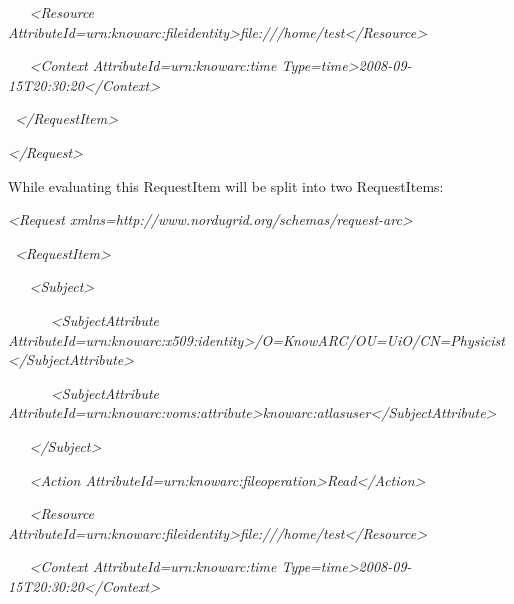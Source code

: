 \documentclass[a4paper]{article}
\begin{document}
{\itshape\color{black}
\ \ \ {\textless}Resource
AttributeId={\textquotedbl}urn:knowarc:fileidentity{\textgreater}file:///home/test{\textless}/Resource{\textgreater}}

{\itshape\color{black}
\ \ \ {\textless}Context
AttributeId={\textquotedbl}urn:knowarc:time{\textquotedbl}
Type={\textquotedbl}time{\textquotedbl}{\textgreater}2008-09-15T20:30:20{\textless}/Context{\textgreater}}

{\itshape\color{black}
\ {\textless}/RequestItem{\textgreater}}

{\itshape\color{black}
{\textless}/Request{\textgreater}}

{\color{black}
While evaluating this RequestItem will be split into two RequestItems:}

{\itshape\color{black}
{\textless}Request
xmlns={\textquotedbl}http://www.nordugrid.org/schemas/request-arc{\textquotedbl}{\textgreater}}

{\itshape\color{black}
\ {\textless}RequestItem{\textgreater}}

{\itshape\color{black}
\ \ \ {\textless}Subject{\textgreater}}

{\itshape\color{black}
\ \ \ \ \ \ {\textless}SubjectAttribute
AttributeId={\textquotedbl}urn:knowarc:x509:identity{\textquotedbl}{\textgreater}/O=KnowARC/OU=UiO/CN=Physicist{\textless}/SubjectAttribute{\textgreater}}

{\itshape\color{black}
\ \ \ \ \ \ {\textless}SubjectAttribute
AttributeId={\textquotedbl}urn:knowarc:voms:attribute{\textgreater}knowarc:atlasuser{\textless}/SubjectAttribute{\textgreater}}

{\itshape\color{black}
\ \ \ {\textless}/Subject{\textgreater}}

{\itshape\color{black}
\ \ \ {\textless}Action
AttributeId={\textquotedbl}urn:knowarc:fileoperation{\textquotedbl}{\textgreater}Read{\textless}/Action{\textgreater}}

{\itshape\color{black}
\ \ \ {\textless}Resource
AttributeId={\textquotedbl}urn:knowarc:fileidentity{\textgreater}file:///home/test{\textless}/Resource{\textgreater}}

{\itshape\color{black}
\ \ \ {\textless}Context
AttributeId={\textquotedbl}urn:knowarc:time{\textquotedbl}
Type={\textquotedbl}time{\textquotedbl}{\textgreater}2008-09-15T20:30:20{\textless}/Context{\textgreater}}
\end{document}
